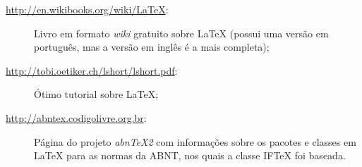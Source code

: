 \begin{description}
 \item[\url{http://en.wikibooks.org/wiki/LaTeX}:] Livro em formato \textit{wiki} gratuito sobre {\LaTeX} (possui uma versão em português, mas a versão em inglês é a mais completa);
 \item[\url{http://tobi.oetiker.ch/lshort/lshort.pdf}:] Ótimo tutorial sobre {\LaTeX};
 \item[\url{http://abntex.codigolivre.org.br}:] Página do projeto \textit{abnTeX2} com informações sobre os pacotes e classes em {\LaTeX} para as normas da ABNT, nos quais a classe {IF\TeX} foi baseada.
\end{description}
